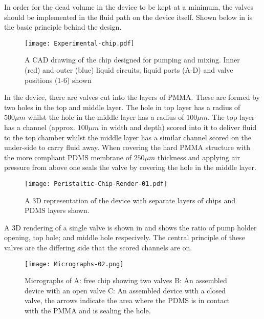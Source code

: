 In order for the dead volume in the device to be kept at a minimum, the valves should be implemented in
the fluid path on the device itself. Shown below in  is the
basic principle behind the design.

\begin{figure}
  \begin{center}
  \texttt{[image: Experimental-chip.pdf]}
  \caption{A CAD drawing of the chip designed for pumping and mixing. Inner (red) and outer (blue) liquid circuits; liquid ports (A-D) and valve positions (1-6) shown}
  \label{fig:Chip}
  \end{center}
\end{figure}

In the device, there are valves cut into the layers of PMMA. These are formed by two holes
in the top and middle layer. The hole in top layer has a radius of $500 \mu m$ whilst the
hole in the middle layer has a radius of $100 \mu m$. The top layer has a channel (approx.
$100\mu m$ in width and depth) scored into it to deliver fluid to the top chamber whilst
the middle layer
has a similar channel scored on the under-side to carry fluid away. When covering the hard
PMMA structure with the more compliant PDMS membrane of $250 \mu m$ thickness and applying
air pressure from above one seals the valve by covering the hole in the middle layer.

\begin{figure}
  \begin{center}
  \texttt{[image: Peristaltic-Chip-Render-01.pdf]}
  \caption{A 3D representation of the device with separate layers of chips and PDMS
  layers shown.}
  \label{fig:3Ddevice}
  \end{center}
\end{figure}

A 3D rendering of a single valve is shown in  and shows the ratio of pump holder opening, top hole; and middle hole respecively. The central principle of these valves
are the differing side that the scored channels are on.

\begin{figure}
  \begin{center}
  \texttt{[image: Micrographs-02.png]}
  \caption{Micrographs of A: free chip showing two valves B: An assembled device with an
  open valve C: An assembled device with a closed valve, the arrows indicate the area where the PDMS is
  in contact with the PMMA and is sealing the hole.}
  \label{fig:Micrographs}
  \end{center}
\end{figure}


